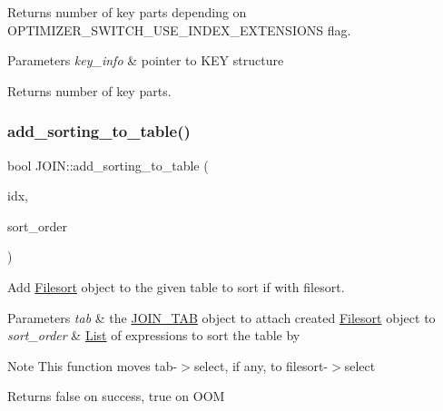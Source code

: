 Returns number of key parts depending on O\+P\+T\+I\+M\+I\+Z\+E\+R\+\_\+\+S\+W\+I\+T\+C\+H\+\_\+\+U\+S\+E\+\_\+\+I\+N\+D\+E\+X\+\_\+\+E\+X\+T\+E\+N\+S\+I\+O\+NS flag.


\begin{DoxyParams}{Parameters}
{\em key\+\_\+info} & pointer to K\+EY structure\\
\hline
\end{DoxyParams}
\begin{DoxyReturn}{Returns}
number of key parts. 
\end{DoxyReturn}
\mbox{\label{group__Query__Optimizer_ga8c14b8b1b7b5f002b219140b565000db}} 
\subsubsection{\texorpdfstring{add\+\_\+sorting\+\_\+to\+\_\+table()}{add\_sorting\_to\_table()}}
{\footnotesize\ttfamily bool J\+O\+I\+N\+::add\+\_\+sorting\+\_\+to\+\_\+table (\begin{DoxyParamCaption}\item[{uint}]{idx,  }\item[{\mbox{\hyperlink{classJOIN_1_1ORDER__with__src}{O\+R\+D\+E\+R\+\_\+with\+\_\+src}} $\ast$}]{sort\+\_\+order }\end{DoxyParamCaption})}



Add \mbox{\hyperlink{classFilesort}{Filesort}} object to the given table to sort if with filesort. 


\begin{DoxyParams}{Parameters}
{\em tab} & the \mbox{\hyperlink{classJOIN__TAB}{J\+O\+I\+N\+\_\+\+T\+AB}} object to attach created \mbox{\hyperlink{classFilesort}{Filesort}} object to \\
\hline
{\em sort\+\_\+order} & \mbox{\hyperlink{classList}{List}} of expressions to sort the table by\\
\hline
\end{DoxyParams}
\begin{DoxyNote}{Note}
This function moves tab-\/$>$select, if any, to filesort-\/$>$select
\end{DoxyNote}
\begin{DoxyReturn}{Returns}
false on success, true on O\+OM 
\end{DoxyReturn}
\mbox{\label{group__Query__Optimizer_ga5932344e1185abf63788970856f45766}} 
